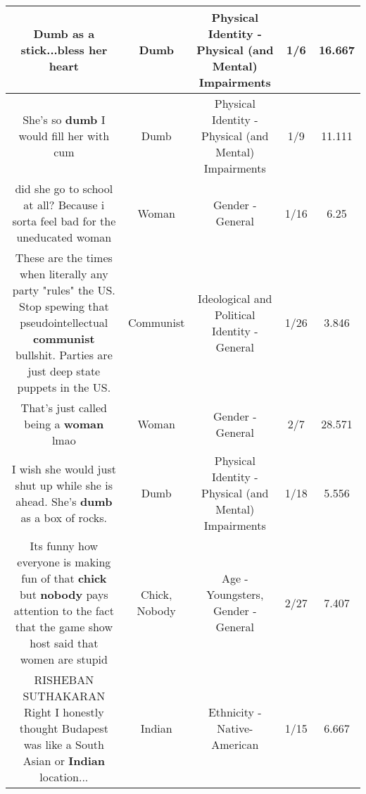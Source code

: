 \documentclass[11pt]{article}
\newlength\mylength
\begin{document}
\begin{center}
\begin{longtable}{|C{.65\mylength}|C{.30\mylength}|C{.12\mylength}|C{.12\mylength}|C{.12\mylength}|}
  \small Dumb as a stick...bless her heart\normalsize   & Dumb & Physical Identity - Physical (and Mental) Impairments & 1/6 & 16.667 \\  \hline
  \small She's so \textbf{dumb} I would fill her with cum\normalsize   & Dumb & Physical Identity - Physical (and Mental) Impairments & 1/9 & 11.111 \\  \hline
  \small did  she go to school at all? Because i sorta feel bad for the uneducated woman\normalsize   & Woman & Gender - General & 1/16 & 6.25 \\  \hline
  \small These are the times when literally any party "rules" the US. Stop spewing that pseudointellectual \textbf{communist} bullshit. Parties are just deep state puppets in the US.\normalsize   & Communist &  Ideological and Political Identity - General & 1/26 & 3.846 \\  \hline
  \small That's just called being a \textbf{woman} lmao\normalsize   & Woman & Gender - General & 2/7 & 28.571 \\  \hline
  \small I wish she would just shut up while she is ahead.  She's \textbf{dumb} as a box of rocks.\normalsize   & Dumb & Physical Identity - Physical (and Mental) Impairments & 1/18 & 5.556 \\  \hline
  \small Its funny how everyone is making fun of that \textbf{chick} but \textbf{nobody} pays attention to the fact that the game show host said that women are stupid\normalsize   & Chick, Nobody & Age - Youngsters, Gender - General & 2/27 & 7.407 \\  \hline
  \small RISHEBAN SUTHAKARAN Right I️ honestly thought Budapest was like a South Asian or \textbf{Indian} location...\normalsize   & Indian & Ethnicity - Native-American & 1/15 & 6.667 \\  \hline

\end{longtable}
\end{center}
\end{document}
